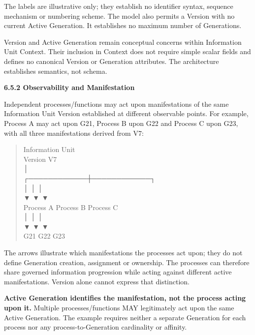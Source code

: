 The labels are illustrative only; they establish no identifier syntax, sequence
mechanism or numbering scheme. The model also permits a Version with no current
Active Generation. It establishes no maximum number of Generations.



Version and Active Generation remain conceptual concerns within Information Unit
Context. Their inclusion in Context does not require simple scalar fields and
defines no canonical Version or Generation attributes. The architecture
establishes semantics, not schema.



\par\medskip\textbf{6.5.2 Observability and Manifestation}\par


Independent processes/functions may act upon manifestations of the same
Information Unit Version established at different observable points. For
example, Process A may act upon G21, Process B upon G22 and Process C upon G23,
with all three manifestations derived from V7:



\begin{quote}\small\ttfamily
                Information Unit\\
                   Version V7\\
                       │\\
          ┌────────────┼────────────┐\\
          │            │            │\\
          ▼            ▼            ▼\\
      Process A    Process B    Process C\\
          │            │            │\\
          ▼            ▼            ▼\\
         G21          G22          G23\\

\end{quote}


The arrows illustrate which manifestations the processes act upon; they do not
define Generation creation, assignment or ownership. The processes can therefore
share governed information progression while acting against different active
manifestations. Version alone cannot express that distinction.



\textbf{Active Generation identifies the manifestation, not the process acting upon
it.} Multiple processes/functions MAY legitimately act upon the same Active
Generation. The example requires neither a separate Generation for each process
nor any process-to-Generation cardinality or affinity.



